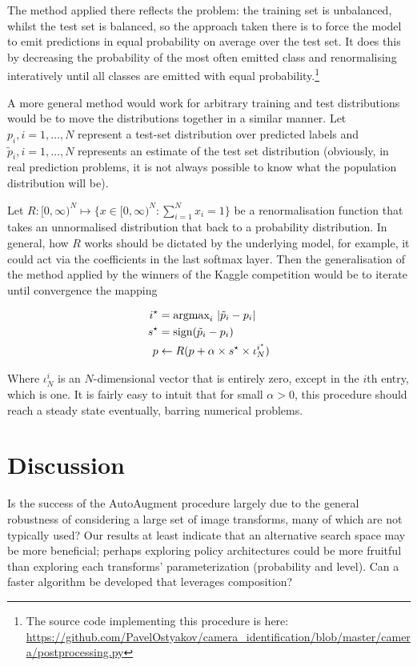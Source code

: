 \documentclass[10pt,twocolumn,letterpaper]{article}
\begin{document}
The method applied there reflects the problem: the training set is unbalanced, whilst the test set is balanced, so the approach taken there is to force the model to emit predictions in equal probability on average over the test set. It does this by decreasing the probability of the most often emitted class and renormalising interatively until all classes are emitted with equal probability.\footnote{The source code implementing this procedure is here: \url{https://github.com/PavelOstyakov/camera_identification/blob/master/camera/postprocessing.py}}

A more general method would work for arbitrary training and test distributions would be to move the distributions together in a similar manner. Let $p_i, i = 1, \hdots, N$ represent a test-set distribution over predicted labels and $\tilde{p}_i, i = 1, \hdots, N$ represents an estimate of the test set distribution (obviously, in real prediction problems, it is not always possible to know what the population distribution will be).

Let $R: [0, \infty)^N \mapsto \{x \in [0, \infty)^N : \sum_{i=1}^N x_i = 1 \}$ be a renormalisation function that takes an unnormalised distribution that back to a probability distribution. In general, how $R$ works should be dictated by the underlying model, for example, it could act via the coefficients in the last softmax layer. Then the generalisation of the method applied by the winners of the Kaggle competition would be to iterate until convergence the mapping

\begin{align*}
i^\star &= \textnormal{argmax}_i\ |\tilde{p}_i - p_i| \\
s^\star &= \textnormal{sign}(\tilde{p}_i - p_i) \\
p &\leftarrow R(p + \alpha \times s^\star \times \iota_N^{i^\star})
\end{align*}

Where $\iota^i_N$ is an $N$-dimensional vector that is entirely zero, except in the $i$th entry, which is one. It is fairly easy to intuit that for small $\alpha > 0$, this procedure should reach a steady state eventually, barring numerical problems. 

\section{Discussion}
  Is the success of the AutoAugment procedure largely due to the general robustness of considering a large set of image transforms, many of which are not typically used? Our results at least indicate that an alternative search space may be more beneficial; perhaps exploring policy architectures could be more fruitful than exploring each transforms' parameterization (probability and level). Can a faster algorithm be developed that leverages composition?
\end{document}
